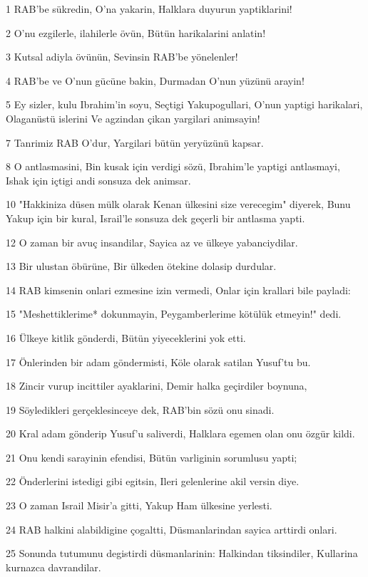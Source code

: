 \par 1 RAB'be sükredin, O'na yakarin, Halklara duyurun yaptiklarini!
\par 2 O'nu ezgilerle, ilahilerle övün, Bütün harikalarini anlatin!
\par 3 Kutsal adiyla övünün, Sevinsin RAB'be yönelenler!
\par 4 RAB'be ve O'nun gücüne bakin, Durmadan O'nun yüzünü arayin!
\par 5 Ey sizler, kulu Ibrahim'in soyu, Seçtigi Yakupogullari, O'nun yaptigi harikalari, Olaganüstü islerini Ve agzindan çikan yargilari animsayin!
\par 7 Tanrimiz RAB O'dur, Yargilari bütün yeryüzünü kapsar.
\par 8 O antlasmasini, Bin kusak için verdigi sözü, Ibrahim'le yaptigi antlasmayi, Ishak için içtigi andi sonsuza dek animsar.
\par 10 "Hakkiniza düsen mülk olarak Kenan ülkesini size verecegim" diyerek, Bunu Yakup için bir kural, Israil'le sonsuza dek geçerli bir antlasma yapti.
\par 12 O zaman bir avuç insandilar, Sayica az ve ülkeye yabanciydilar.
\par 13 Bir ulustan öbürüne, Bir ülkeden ötekine dolasip durdular.
\par 14 RAB kimsenin onlari ezmesine izin vermedi, Onlar için krallari bile payladi:
\par 15 "Meshettiklerime* dokunmayin, Peygamberlerime kötülük etmeyin!" dedi.
\par 16 Ülkeye kitlik gönderdi, Bütün yiyeceklerini yok etti.
\par 17 Önlerinden bir adam göndermisti, Köle olarak satilan Yusuf'tu bu.
\par 18 Zincir vurup incittiler ayaklarini, Demir halka geçirdiler boynuna,
\par 19 Söyledikleri gerçeklesinceye dek, RAB'bin sözü onu sinadi.
\par 20 Kral adam gönderip Yusuf'u saliverdi, Halklara egemen olan onu özgür kildi.
\par 21 Onu kendi sarayinin efendisi, Bütün varliginin sorumlusu yapti;
\par 22 Önderlerini istedigi gibi egitsin, Ileri gelenlerine akil versin diye.
\par 23 O zaman Israil Misir'a gitti, Yakup Ham ülkesine yerlesti.
\par 24 RAB halkini alabildigine çogaltti, Düsmanlarindan sayica arttirdi onlari.
\par 25 Sonunda tutumunu degistirdi düsmanlarinin: Halkindan tiksindiler, Kullarina kurnazca davrandilar.
